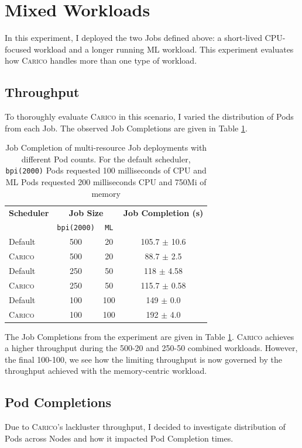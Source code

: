 \section{Mixed Workloads}
\label{sec:eval-mixed}
In this experiment, I deployed the two Jobs defined above: a short-lived
CPU-focused workload and a longer running ML workload. This experiment evaluates
how \textsc{Carico} handles more than one type of workload.

\subsection{Throughput}
To thoroughly evaluate \textsc{Carico} in this scenario, I varied the distribution of
Pods from each Job. The observed Job Completions are given in Table
\ref{tab:mixed-throughput}.

\begin{table}[ht!]
\centering
    \begin{tabular}{|l|c|c|c|}
    \hline
    \textbf{Scheduler} & \multicolumn{2}{c|}{\textbf{Job Size}} &
        \textbf{Job Completion (s)} \\ \cline{2-3}
        &  \texttt{bpi(2000)} & \texttt{ML} & \\
    \hline
        Default & 500 & 20 & 105.7 $\pm$ 10.6 \\
        \textsc{Carico} & 500 & 20 & 88.7 $\pm$ 2.5 \\
        Default & 250 & 50 & 118 $\pm$ 4.58 \\
        \textsc{Carico} & 250 & 50 & 115.7 $\pm$ 0.58 \\
        Default & 100 & 100 & 149 $\pm$ 0.0 \\
        \textsc{Carico} & 100 & 100 & 192 $\pm$ 4.0 \\
    \hline
    \end{tabular}
    \caption{Job Completion of multi-resource Job deployments with different Pod
    counts. For the default scheduler, \texttt{bpi(2000)} Pods requested 100
    milliseconds of CPU and ML Pods requested 200 milliseconds CPU and 750Mi of
    memory}
    \label{tab:mixed-throughput}
\end{table}
The Job Completions from the experiment are given in Table
\ref{tab:mixed-throughput}. \textsc{Carico} achieves a higher throughput during the
500-20 and 250-50 combined workloads. However, the final 100-100, we see how the
limiting throughput is now governed by the throughput achieved with the
memory-centric workload.

\subsection{Pod Completions}
Due to \textsc{Carico}'s lackluster throughput, I decided to investigate distribution of
Pods across Nodes and how it impacted Pod Completion times.

